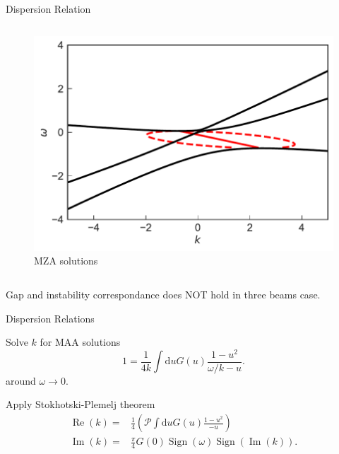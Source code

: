 \documentclass[9pt]{beamer}
\begin{document}
\begin{darkframes}
\begin{frame}{Dispersion Relation}
\begin{columns}[T]
\begin{column}{0.5\textwidth}
   \begin{figure}
      \includegraphics[width=\linewidth]{assets/dr/spectDB3WC4DRDBMZAPltBlob.pdf}
      \caption*{ MZA solutions}
   \end{figure}
\end{column}

   \end{columns}







\pause
   \begin{tcolorbox}
      \centering
      Gap and instability correspondance does NOT hold in three beams case.
   \end{tcolorbox}



\end{frame}

\begin{frame}{Dispersion Relations}

Solve $k$ for MAA solutions
\begin{equation*}
   1 = \frac{1}{4k} \int \mathrm du G(u) \frac{ 1 - u^2 }{ \omega/k - u }.
\end{equation*}
around  $\omega\to 0$.

\pause

Apply Stokhotski-Plemelj theorem
\begin{align*}
\operatorname{Re}(k) =& \frac{1}{4}\left(  \mathcal{P} \int \mathrm d u G(u) \frac{ 1 - u^2 }{ - u }  \right)\label{eqn-re-k-arbitrary-spectrum} \\
\operatorname{Im}(k) =&  \frac{\pi}{4}G(0) \operatorname{Sign}\left( \omega \right) \operatorname{Sign}\left(  \operatorname{Im}(k)  \right).
\end{align*}


\end{frame}
\end{darkframes}
\end{document}
